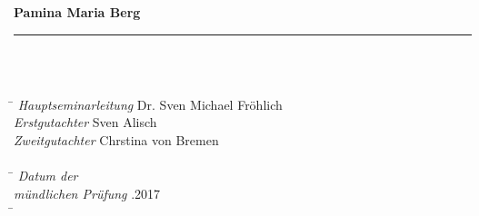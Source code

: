 \begin{titlepage}
\vspace*{15ex}
	\noindent \textbf{Pamina Maria Berg}\\
	\noindent \rule{\textwidth}{0.4mm} 
	 \\	
	 \\
\vspace*{2.5ex}
\begin{tabbing}
\hspace{10em} \=  \kill
\emph{Hauptseminarleitung} \> Dr. Sven Michael Fröhlich \\
\emph{Erstgutachter} \> Sven Alisch \\
\emph{Zweitgutachter} \> Chrstina von Bremen \\
 \> \\
 \hspace{10em} \=  \kill
\emph{Datum der} \> \\
\emph{mündlichen Prüfung} .2017 \\
 \hspace{10em} \=  \kill
\end{tabbing}

\end{titlepage}

